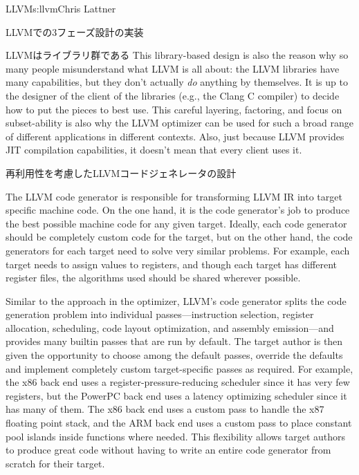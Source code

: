 \begin{aosachapter}{LLVM}{s:llvm}{Chris Lattner}
\begin{aosasect1}{LLVMでの3フェーズ設計の実装}
\begin{aosasect2}{LLVMはライブラリ群である}
This library-based design is also the reason why so many people
misunderstand what LLVM is all about: the LLVM libraries have many
capabilities, but they don't actually \emph{do} anything by themselves.
It is up to the designer of the client of the libraries (e.g., the
Clang C compiler) to decide how to put the pieces to best use.  This
careful layering, factoring, and focus on subset-ability is also why
the LLVM optimizer can be used for such a broad range of different
applications in different contexts.  Also, just because LLVM provides
JIT compilation capabilities, it doesn't mean that every client uses
it.

\end{aosasect2}

\end{aosasect1}

\begin{aosasect1}{再利用性を考慮したLLVMコードジェネレータの設計}

The LLVM code generator is responsible for transforming LLVM IR into
target specific machine code.  On the one hand, it is the code
generator's job to produce the best possible machine code for any
given target.  Ideally, each code generator should be completely
custom code for the target, but on the other hand, the code generators
for each target need to solve very similar problems.  For example,
each target needs to assign values to registers, and though each
target has different register files, the algorithms used should be
shared wherever possible.

Similar to the approach in the optimizer, LLVM's code generator splits
the code generation problem into individual passes---instruction
selection, register allocation, scheduling, code layout optimization,
and assembly emission---and provides many builtin passes that are run
by default.  The target author is then given the opportunity to choose
among the default passes, override the defaults and implement
completely custom target-specific passes as required.  For example,
the x86 back end uses a register-pressure-reducing scheduler since it
has very few registers, but the PowerPC back end uses a latency
optimizing scheduler since it has many of them.  The x86 back end uses
a custom pass to handle the x87 floating point stack, and the ARM
back end uses a custom pass to place constant pool islands inside
functions where needed.  This flexibility allows target authors to
produce great code without having to write an entire code generator
from scratch for their target.


\end{aosasect1}
\end{aosachapter}
